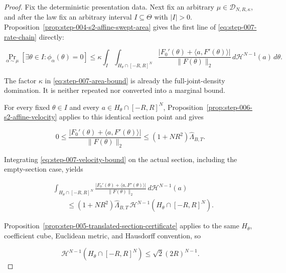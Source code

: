 \begin{proof}
Fix the deterministic presentation data. Next fix an arbitrary
\(\mu\in\mathcal D_{N,R,\kappa}\), and after the law fix an arbitrary interval
\(I\subseteq\Theta\) with \(\lvert I\rvert>0\). Proposition~\ref{prop:step-004-s2-affine-swept-area} gives the first line of
\eqref{eq:step-007-rate-chain} directly:

\begin{equation}
\Pr_{\alpha\sim\mu}[\exists\theta\in I:\phi_\alpha(\theta)=0]
\leq
\kappa\int_I\int_{H_\theta\cap[-R,R]^N}
\frac{\lvert F_0'(\theta)+\langle a,F'(\theta)\rangle\rvert}
{\lVert F(\theta)\rVert_2}
\,d\mathcal H^{N-1}(a)\,d\theta.
\label{eq:step-007-area-bound}
\end{equation}

The factor \(\kappa\) in \eqref{eq:step-007-area-bound} is already the full-joint-density domination. It is neither repeated nor
converted into a marginal bound.

For every fixed \(\theta\in I\) and every
\(a\in H_\theta\cap[-R,R]^N\), Proposition~\ref{prop:step-006-s2-affine-velocity} applies to this identical section point and gives

\begin{equation}
0\leq
\frac{\lvert F_0'(\theta)+\langle a,F'(\theta)\rangle\rvert}
{\lVert F(\theta)\rVert_2}
\leq(1+NR^2)\widehat\Lambda_{B,T}.
\label{eq:step-007-velocity-bound}
\end{equation}

Integrating \eqref{eq:step-007-velocity-bound} on the actual section,
including the empty-section case, yields

\begin{equation}
\begin{aligned}
&\int_{H_\theta\cap[-R,R]^N}
\frac{\lvert F_0'(\theta)+\langle a,F'(\theta)\rangle\rvert}
{\lVert F(\theta)\rVert_2}
\,d\mathcal H^{N-1}(a)\\
&\qquad\leq
(1+NR^2)\widehat\Lambda_{B,T}\,
\mathcal H^{N-1}(H_\theta\cap[-R,R]^N).
\end{aligned}
\label{eq:step-007-section-integrand-bound}
\end{equation}

Proposition~\ref{prop:step-005-translated-section-certificate} applies to the same
\(H_\theta\), coefficient cube, Euclidean metric, and Hausdorff convention, so

\begin{equation}
\mathcal H^{N-1}(H_\theta\cap[-R,R]^N)
\leq\sqrt2(2R)^{N-1}.
\label{eq:step-007-section-measure}
\end{equation}


\end{proof}
